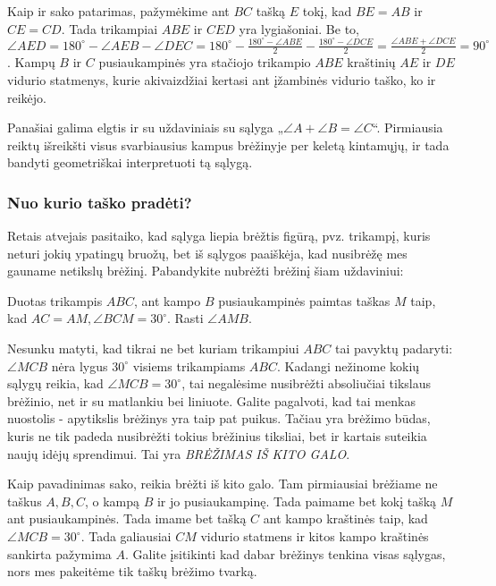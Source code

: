 \begin{sprendimas}
  Kaip ir sako patarimas, pažymėkime ant $BC$ tašką $E$ tokį, kad $BE = AB$
  ir $CE = CD$. Tada trikampiai $ABE$ ir $CED$ yra lygiašoniai. Be to,
  $\angle AED = 180^\circ - \angle AEB - \angle DEC = 180^\circ -
  \frac{180^\circ - \angle ABE}{2} - \frac{180^\circ - \angle DCE}{2} =
  \frac{\angle ABE + \angle DCE}{2} = 90^\circ$. Kampų $B$ ir $C$
  pusiaukampinės yra stačiojo trikampio $ABE$ kraštinių $AE$ ir $DE$
  vidurio statmenys, kurie akivaizdžiai kertasi ant įžambinės vidurio
  taško, ko ir reikėjo.
\end{sprendimas}  

Panašiai galima elgtis ir su uždaviniais su sąlyga „$\angle A + \angle B =
\angle C$“. Pirmiausia reiktų išreikšti visus svarbiausius kampus brėžinyje
per keletą kintamųjų, ir tada bandyti geometriškai interpretuoti tą sąlygą.

\subsubsection{Nuo kurio taško pradėti?}
Retais atvejais pasitaiko, kad sąlyga liepia brėžtis figūrą,
pvz. trikampį, kuris neturi jokių ypatingų bruožų, bet iš sąlygos paaiškėja,
kad nusibrėžę mes gauname netikslų brėžinį. Pabandykite nubrėžti
brėžinį šiam uždaviniui:

\begin{pav}
Duotas trikampis $ABC$, ant kampo $B$ pusiaukampinės paimtas taškas $M$
taip, kad $AC=AM,\angle BCM=30^\circ$. Rasti $\angle AMB$.
\end{pav}

Nesunku matyti, kad tikrai ne bet kuriam trikampiui $ABC$ tai pavyktų padaryti:
$\angle MCB$ nėra lygus $30^\circ$ visiems trikampiams $ABC$. Kadangi nežinome kokių
sąlygų reikia, kad $\angle MCB=30^\circ$, tai negalėsime nusibrėžti absoliučiai
tikslaus brėžinio, net ir su matlankiu bei liniuote. Galite pagalvoti, kad tai menkas
nuostolis - apytikslis brėžinys yra taip pat puikus. Tačiau yra brėžimo būdas, kuris
ne tik padeda nusibrėžti tokius brėžinius tiksliai, bet ir kartais suteikia naujų idėjų
sprendimui. Tai yra \textit{BRĖŽIMAS IŠ KITO GALO}.

Kaip pavadinimas sako, reikia brėžti iš kito galo. Tam pirmiausiai brėžiame ne
taškus $A,B,C$, o kampą $B$ ir jo pusiaukampinę. Tada paimame bet kokį tašką $M$
ant pusiaukampinės. Tada imame bet tašką $C$ ant kampo kraštinės taip, kad 
$\angle MCB=30^\circ$. Tada galiausiai $CM$ vidurio statmens ir kitos kampo kraštinės
sankirta pažymima $A$. Galite įsitikinti kad dabar brėžinys tenkina visas sąlygas,
nors mes pakeitėme tik taškų brėžimo tvarką.

